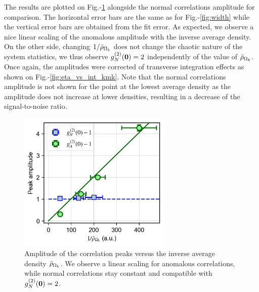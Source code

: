 The results are plotted on Fig.-\ref{fig:amplitude_vs_rhob} alongside the normal correlations amplitude for comparison. The horizontal error bars are the same as for Fig.-\ref{fig:width} while the vertical error bars are obtained from the fit error. As expected, we observe a nice linear scaling of the anomalous amplitude with the inverse average density. On the other side, changing $1/\bar{\rho}_{\Omega_k}$ does not change the chaotic nature of the system statistics, we thus observe $g^{(2)}_N (\bm{0})=2$ independently of the value of $\bar{\rho}_{\Omega_k}$. Once again, the amplitudes were corrected of transverse integration effects as shown on Fig.-\ref{fig:eta_vs_int_kmk}. Note that the normal correlations amplitude is not shown for the point at the lowest average density as the amplitude does not increase at lower densities, resulting in a decrease of the signal-to-noise ratio.

\begin{figure}
    \centering
    \includegraphics[width=0.65\textwidth]{Fig/Chapter4/amplitude_kmk.png}
    \caption{Amplitude of the correlation peaks versus the inverse average density $\bar{\rho}_{\Omega_k}$. We observe a linear scaling for anomalous correlations, while normal correlations stay constant and compatible with $g^{(2)}_N (\bm{0})=2$.}
    \label{fig:amplitude_vs_rhob}
\end{figure}

